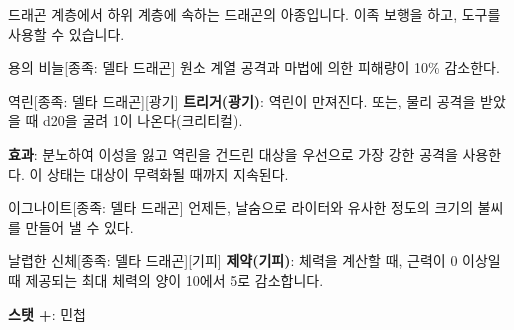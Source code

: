 \documentclass{report}
\begin{document}
	드래곤 계층에서 하위 계층에 속하는 드래곤의 아종입니다. 이족 보행을 하고, 도구를 사용할 수 있습니다.
	
	\begin{story}{용의 비늘}{[종족: 델타 드래곤]}
		원소 계열 공격과 마법에 의한 피해량이 10\% 감소한다.
		
	\end{story}
	
	\begin{story}{역린}{[종족: 델타 드래곤][광기]}
		\textbf{트리거(광기)}: 역린이 만져진다. 또는, 물리 공격을 받았을 때 d20을 굴려 1이 나온다(크리티컬).
		
		\textbf{효과}: 분노하여 이성을 잃고 역린을 건드린 대상을 우선으로 가장 강한 공격을 사용한다. 이 상태는 대상이 무력화될 때까지 지속된다.
		
	\end{story}
	
	\begin{story}{이그나이트}{[종족: 델타 드래곤]}
		언제든, 날숨으로 라이터와 유사한 정도의 크기의 불씨를 만들어 낼 수 있다.
		
	\end{story}
	
	\begin{story}{날렵한 신체}{[종족: 델타 드래곤][기피]}
		\textbf{제약(기피)}: 체력을 계산할 때, 근력이 0 이상일 때 제공되는 최대 체력의 양이 10에서 5로 감소합니다.
		
		\textbf{스탯 +}: 민첩
		
	\end{story}
\end{document}
